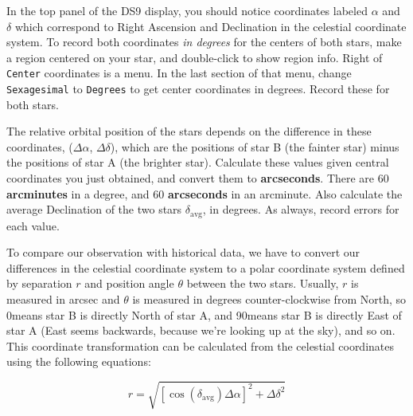 
In the top panel of the DS9 display, you should notice coordinates labeled $\alpha$ and $\delta$ which correspond to Right Ascension and Declination in the celestial coordinate system. To record both coordinates \textit{in degrees} for the centers of both stars, make a region centered on your star, and double-click to show region info. Right of \texttt{Center} coordinates is a menu. In the last section of that menu, change \texttt{Sexagesimal} to \texttt{Degrees} to get center coordinates in degrees. Record these for both stars.   

The relative orbital position of the stars depends on the difference in these coordinates, ($\Delta\alpha$, $\Delta\delta$), which are the positions of star B (the fainter star) minus the positions of star A (the brighter star). Calculate these values given central coordinates you just obtained, and convert them to \textbf{arcseconds}. There are 60 \textbf{arcminutes} in a degree, and 60 \textbf{arcseconds} in an arcminute. Also calculate the average Declination of the two stars $\delta_{\textrm{avg}}$, in degrees. As always, record errors for each value.  %

To compare our observation with historical data, we have to convert our differences in the celestial coordinate system to a polar coordinate system defined by separation $r$ and position angle $\theta$ between the two stars. Usually, $r$ is measured in arcsec and $\theta$ is measured in degrees counter-clockwise from North, so $0$\textdegree means star B is directly North of star A, and 90\textdegree means star B is directly East of star A (East seems backwards, because we’re looking up at the sky), and so on. This coordinate transformation can be calculated from the celestial coordinates using the following equations:

\begin{equation}
r = \sqrt{[\cos(\delta_{\textrm{avg}})\Delta\alpha]^2 + \Delta\delta^2}
\end{equation}

